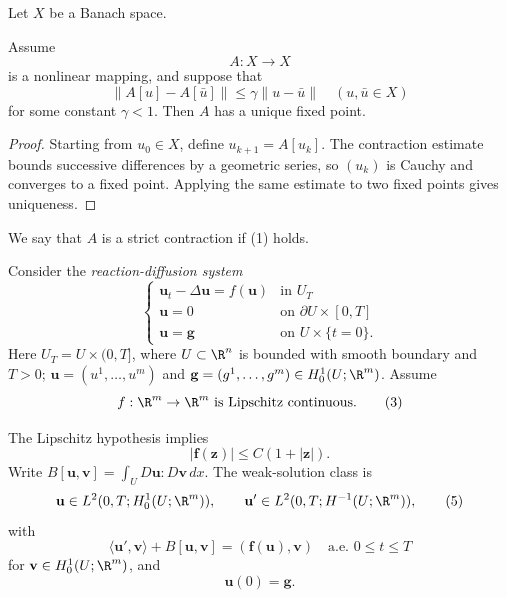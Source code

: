 Let $X$ be a Banach space.

\begin{theorem}
\label{thm:banach-fixed-point-theorem}
Assume
\[
A : X \to X
\]
is a nonlinear mapping, and suppose that
\[
\|A[u] - A[\bar{u}]\| \leq \gamma \|u - \bar{u}\| \quad (u, \bar{u} \in X)
\tag{1}
\]
for some constant $\gamma < 1$. Then $A$ has a unique fixed point.
\end{theorem}

\begin{proof}
\sketch Starting from $u_0\in X$, define $u_{k+1}=A[u_k]$. The contraction estimate bounds successive differences by a geometric series, so $(u_k)$ is Cauchy and converges to a fixed point. Applying the same estimate to two fixed points gives uniqueness.
\end{proof}

\begin{definition}
\label{def:strict-contraction}
We say that $A$ is a strict contraction if (1) holds.
\end{definition}

\begin{example}
\label{ex:reaction-diffusion-banach-fixed-point}
Consider the \textit{reaction-diffusion system}
\[
\begin{cases}
\mathbf{u}_t - \Delta \mathbf{u} = f(\mathbf{u}) & \text{in } U_T \\
\mathbf{u} = 0 & \text{on } \partial U \times [0,T] \\
\mathbf{u} = \mathbf{g} & \text{on } U \times \{t = 0\}.
\end{cases}
\tag{2}
\]
Here $U_T=U\times(0,T]$, where $U\subset\R^n$ is bounded with smooth boundary and $T>0$; $\mathbf u=(u^1,\ldots,u^m)$ and $\mathbf g=(g^1,\ldots,g^m)\in H_0^1(U;\R^m)$. Assume
\[
f : \R^m \to \R^m \text{ is Lipschitz continuous.}
\tag{3}
\]
\end{example}

The Lipschitz hypothesis implies
\[
|\mathbf f(\mathbf z)|\leq C(1+|\mathbf z|).
\tag{4}
\]
Write $B[\mathbf u,\mathbf v]=\int_U D\mathbf u:D\mathbf v\,dx$. The weak-solution class is
\[
\mathbf u\in L^2(0,T;H_0^1(U;\R^m)),
\qquad
\mathbf u'\in L^2(0,T;H^{-1}(U;\R^m)),
\tag{5}
\]
with
\[
\langle\mathbf u',\mathbf v\rangle+B[\mathbf u,\mathbf v]
=(\mathbf f(\mathbf u),\mathbf v)
\quad\text{a.e. }0\leq t\leq T
\tag{6}
\]
for $\mathbf v\in H_0^1(U;\R^m)$, and
\[
\mathbf u(0)=\mathbf g.
\tag{7}
\]

